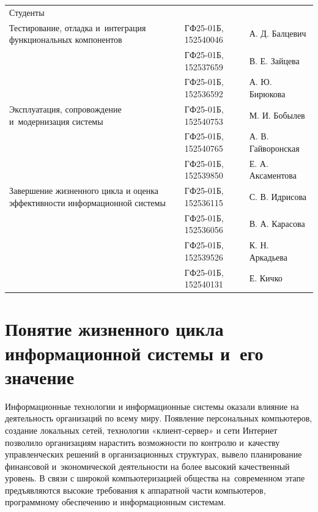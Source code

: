 \documentclass{ou}
\begin{document}
\begin{flushleft}
\doublespacing
\begin{tabularx}{\textwidth}{@{} p{} l l @{}}
Студенты     &                     &         \\
\multirow{-2.27}{\hsize}{\singlespacing Тестирование, отладка и~интеграция функциональных компонентов}
             & ГФ25-01Б, 152540046 & А. Д. Балцевич\\
             & ГФ25-01Б, 152537659 & В. Е. Зайцева\\
             & ГФ25-01Б, 152536592 & А. Ю. Бирюкова\\
\multirow{-2.27}{\hsize}{\singlespacing Эксплуатация, сопровождение и~модернизация системы}
             & ГФ25-01Б, 152540753 & М. И. Бобылев\\
             & ГФ25-01Б, 152540765 & А. В. Гайворонская\\
             & ГФ25-01Б, 152539850 & Е. А. Аксаментова\\
\multirow{-2.27}{\hsize}{\singlespacing Завершение жизненного цикла и оценка эффективности информационной системы}
             & ГФ25-01Б, 152536115 & С. В. Идрисова\\
             & ГФ25-01Б, 152536056 & В. А. Карасова\\
             & ГФ25-01Б, 152539526 & К. Н. Аркадьева\\
             & ГФ25-01Б, 152540131 & Е. Кичко\\
\end{tabularx}
\end{flushleft}
\newpage
\tableofcontents
\newpage
\onehalfspacing
\section{Понятие жизненного цикла информационной системы и~его значение}
Информационные технологии и информационные системы оказали влияние на деятельность организаций по всему миру. Появление персональных компьютеров, создание локальных сетей, технологии «клиент-сервер» и сети Интернет позволило организациям нарастить возможности по контролю и~качеству управленческих решений в организационных структурах, вывело планирование финансовой и~экономической деятельности на более высокий качественный уровень. В связи с широкой компьютеризацией общества на~современном этапе предъявляются высокие требования к аппаратной части компьютеров, программному обеспечению и информационным системам.
\end{document}
